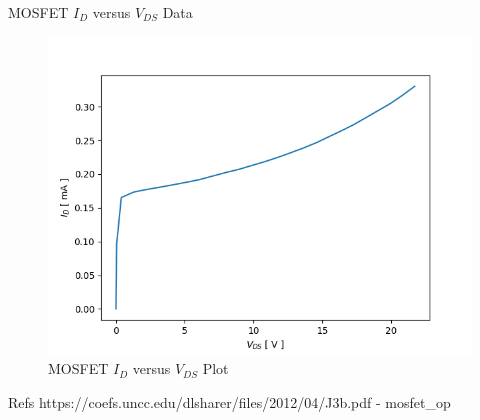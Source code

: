 \FloatBarrier

\begin{table}[h!]
	\centering
	\caption{MOSFET $I_D$ versus $V_{DS}$ Data}
	\label{tab:mosfet_id_vds}
\end{table}

\FloatBarrier

\FloatBarrier

\begin{figure}[h!]
	\centering
	\includegraphics[scale=0.75]{../images/mosfet_id_vds.PNG}
	\caption{MOSFET $I_D$ versus $V_{DS}$ Plot}
	\label{fig:mosfet_id_vds}
\end{figure}

\FloatBarrier

Refs
https://coefs.uncc.edu/dlsharer/files/2012/04/J3b.pdf - mosfet_op
